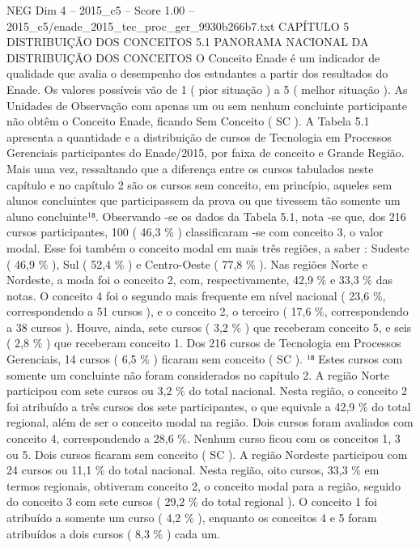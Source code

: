\begin{textsample}{NEG Dim 4 – 2015\_c5 – Score 1.00 – 2015\_c5/enade\_2015\_tec\_proc\_ger\_9930b266b7.txt}  \label{ex:f4_neg_186}
CAPÍTULO 5 DISTRIBUIÇÃO DOS CONCEITOS 5.1 PANORAMA NACIONAL DA DISTRIBUIÇÃO DOS CONCEITOS O Conceito Enade é um indicador de qualidade que avalia o desempenho dos estudantes a partir dos resultados do Enade.
Os valores possíveis vão de 1 ( pior situação ) a 5 ( melhor situação ).
As Unidades de Observação com apenas um ou sem nenhum concluinte participante não obtêm o Conceito Enade, ficando Sem Conceito ( SC ).
A Tabela 5.1 apresenta a quantidade e a distribuição de cursos de Tecnologia em Processos Gerenciais participantes do Enade/2015, por faixa de conceito e Grande Região.
Mais uma vez, ressaltando que a diferença entre os cursos tabulados neste capítulo e no capítulo 2 são os cursos sem conceito, em princípio, aqueles sem alunos concluintes que participassem da prova ou que tivessem tão somente um aluno concluinte¹⁸.
Observando -se os dados da Tabela 5.1, nota -se que, dos 216 cursos participantes, 100 ( 46,3 \% ) classificaram -se com conceito 3, o valor modal.
Esse foi também o conceito modal em mais três regiões, a saber : Sudeste ( 46,9 \% ), Sul ( 52,4 \% ) e Centro-Oeste ( 77,8 \% ).
Nas regiões Norte e Nordeste, a moda foi o conceito 2, com, respectivamente, 42,9 \% e 33,3 \% das notas.
O conceito 4 foi o segundo mais frequente em nível nacional ( 23,6 \%, correspondendo a 51 cursos ), e o conceito 2, o terceiro ( 17,6 \%, correspondendo a 38 cursos ).
Houve, ainda, sete cursos ( 3,2 \% ) que receberam conceito 5, e seis ( 2,8 \% ) que receberam conceito 1.
Dos 216 cursos de Tecnologia em Processos Gerenciais, 14 cursos ( 6,5 \% ) ficaram sem conceito ( SC ). ¹⁸ Estes cursos com somente um concluinte não foram considerados no capítulo 2.
A região Norte participou com sete cursos ou 3,2 \% do total nacional.
Nesta região, o conceito 2 foi atribuído a três cursos dos sete participantes, o que equivale a 42,9 \% do total regional, além de ser o conceito modal na região.
Dois cursos foram avaliados com conceito 4, correspondendo a 28,6 \%.
Nenhum curso ficou com os conceitos 1, 3 ou 5.
Dois cursos ficaram sem conceito ( SC ).
A região Nordeste participou com 24 cursos ou 11,1 \% do total nacional.
Nesta região, oito cursos, 33,3 \% em termos regionais, obtiveram conceito 2, o conceito modal para a região, seguido do conceito 3 com sete cursos ( 29,2 \% do total regional ).
O conceito 1 foi atribuído a somente um curso ( 4,2 \% ), enquanto os conceitos 4 e 5 foram atribuídos a dois cursos ( 8,3 \% ) cada um.

\end{textsample}
